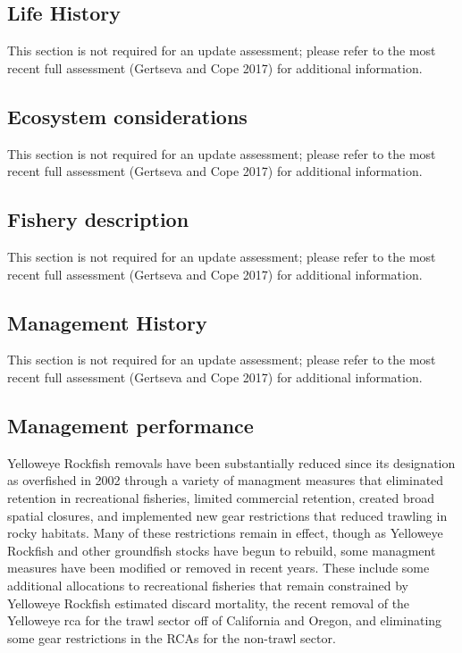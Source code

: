 \documentclass[
]{scrartcl}
\begin{document}
\subsection{Life History}\label{life-history}

This section is not required for an update assessment; please refer to
the most recent full assessment (Gertseva and Cope 2017) for additional
information.

\subsection{Ecosystem considerations}\label{ecosystem-considerations-1}

This section is not required for an update assessment; please refer to
the most recent full assessment (Gertseva and Cope 2017) for additional
information.

\subsection{Fishery description}\label{fishery-description}

This section is not required for an update assessment; please refer to
the most recent full assessment (Gertseva and Cope 2017) for additional
information.

\subsection{Management History}\label{management-history}

This section is not required for an update assessment; please refer to
the most recent full assessment (Gertseva and Cope 2017) for additional
information.

\subsection{Management performance}\label{management-performance-1}

Yelloweye Rockfish removals have been substantially reduced since its
designation as overfished in 2002 through a variety of managment
measures that eliminated retention in recreational fisheries, limited
commercial retention, created broad spatial closures, and implemented
new gear restrictions that reduced trawling in rocky habitats. Many of
these restrictions remain in effect, though as Yelloweye Rockfish and
other groundfish stocks have begun to rebuild, some managment measures
have been modified or removed in recent years. These include some
additional allocations to recreational fisheries that remain constrained
by Yelloweye Rockfish estimated discard mortality, the recent removal of
the Yelloweye \gls{rca} for the trawl sector off of California and
Oregon, and eliminating some gear restrictions in the RCAs for the
non-trawl sector.
\end{document}
